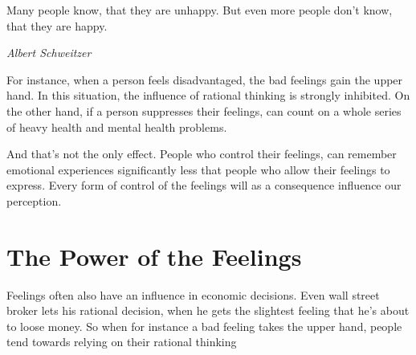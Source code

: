 \documentclass[../Book.Stress_regulation.tex]{subfiles}
\begin{document}
\epigraph{Many people know, that they are unhappy. But even more people don't know, that they are happy.}{\textit{Albert Schweitzer}}

For instance, when a person feels disadvantaged, the bad feelings gain the upper hand.
In this situation, the influence of rational thinking is strongly inhibited.
On the other hand, if a person suppresses their feelings, can count on a whole series of heavy health and mental health problems.

And that's not the only effect.
People who control their feelings, can remember emotional experiences significantly less that people who allow their feelings to express.
Every form of control of the feelings will as a consequence influence our perception.

\section{The Power of the Feelings}


Feelings often also have an influence in economic decisions.
Even wall street broker lets his rational decision, when he gets the slightest feeling that he's about to loose money.
So when for instance a bad feeling takes the upper hand, people tend towards relying on their rational thinking
\end{document}
